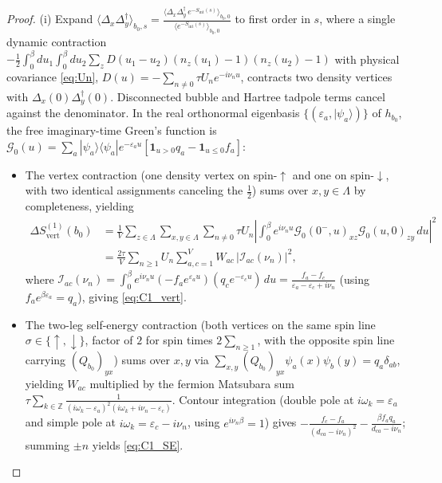 \documentclass[11pt]{article}
\theoremstyle{definition}
\theoremstyle{remark}
\DeclareMathOperator{\vertop}{vert}
\newcommand{\Z}{\mathbb{Z}}
\begin{document}
\begin{proof}
(i) Expand $\langle \Delta_x \Delta_y^\dagger \rangle_{b_0, s} = \frac{\langle \Delta_x \Delta_y^\dagger \, e^{-S_{\mathrm{int}}(s)} \rangle_{b_0,0}}{\langle e^{-S_{\mathrm{int}}(s)}\rangle_{b_0,0}}$ to first order in $s$, where a single dynamic contraction $-\frac{1}{2}\int_0^\beta du_1 \int_0^\beta du_2 \sum_z D(u_1-u_2)(n_z(u_1)-1)(n_z(u_2)-1)$ with physical covariance \eqref{eq:Un}, $D(u) = -\sum_{n\neq 0}\tau U_n e^{-i\nu_n u}$, contracts two density vertices with $\Delta_x(0)\Delta_y^\dagger(0)$. Disconnected bubble and Hartree tadpole terms cancel against the denominator. In the real orthonormal eigenbasis $\{(\varepsilon_a, |\psi_a\rangle)\}$ of $h_{b_0}$, the free imaginary-time Green's function is $\mathcal{G}_0(u) = \sum_a |\psi_a\rangle\langle\psi_a| e^{-\varepsilon_a u} [\mathbf{1}_{u>0} q_a - \mathbf{1}_{u \le 0} f_a]$:
\begin{itemize}[leftmargin=1.8em]
\item The vertex contraction (one density vertex on spin-$\uparrow$ and one on spin-$\downarrow$, with two identical assignments canceling the $\frac{1}{2}$) sums over $x,y \in \Lambda$ by completeness, yielding
\begin{align*}
\Delta S^{(1)}_{\vertop}(b_0) &= \frac{1}{V} \sum_{z\in\Lambda} \sum_{x,y\in\Lambda} \sum_{n\neq 0} \tau U_n \left|\int_0^\beta e^{i\nu_n u} \mathcal{G}_0(0^-, u)_{xz} \mathcal{G}_0(u, 0)_{zy}\,du\right|^2 \\
&= \frac{2\tau}{V} \sum_{n\ge 1} U_n \sum_{a,c=1}^V W_{ac}\, |\mathcal{I}_{ac}(\nu_n)|^2,
\end{align*}
where $\mathcal{I}_{ac}(\nu_n) = \int_0^\beta e^{i\nu_n u} (-f_a e^{\varepsilon_a u}) (q_c e^{-\varepsilon_c u})\,du = \frac{f_a - f_c}{\varepsilon_a - \varepsilon_c + i\nu_n}$ (using $f_a e^{\beta\varepsilon_a} = q_a$), giving \eqref{eq:C1_vert}.
\item The two-leg self-energy contraction (both vertices on the same spin line $\sigma \in \{\uparrow, \downarrow\}$, factor of $2$ for spin times $2\sum_{n\ge 1}$, with the opposite spin line carrying $(Q_{b_0})_{yx}$) sums over $x,y$ via $\sum_{x,y} (Q_{b_0})_{yx} \psi_a(x) \psi_b(y) = q_a \delta_{ab}$, yielding $W_{ac}$ multiplied by the fermion Matsubara sum $\tau \sum_{k\in\Z} \frac{1}{(i\omega_k - \varepsilon_a)^2 (i\omega_k + i\nu_n - \varepsilon_c)}$. Contour integration (double pole at $i\omega_k = \varepsilon_a$ and simple pole at $i\omega_k = \varepsilon_c - i\nu_n$, using $e^{i\nu_n\beta}=1$) gives $-\frac{f_c - f_a}{(d_{ca}-i\nu_n)^2} - \frac{\beta f_a q_a}{d_{ca} - i\nu_n}$; summing $\pm n$ yields \eqref{eq:C1_SE}.
\end{itemize}


\end{proof}
\end{document}
